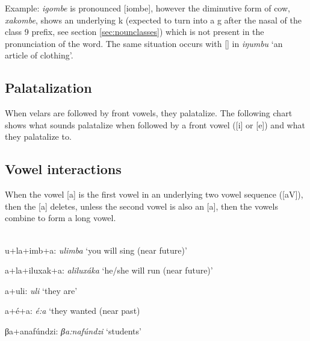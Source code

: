 
Example: \emph{i\engma{}gombe} is pronounced [i\engma{}ombe], however the diminutive form of cow, \emph{xakombe}, shows an underlying k (expected to turn into a g after the nasal of the class 9 prefix, see section \ref{sec:nounclasses}) which is not present in the pronunciation of the word.  The same situation occurs with [\engma{}] in \emph{iŋumbu} `an article of clothing'.

\subsection{Palatalization}
When velars are followed by front vowels, they palatalize.  The following chart shows what sounds palatalize when followed by a front vowel ([i] or [e]) and what they palatalize to.

\noindent\begin{minipage}{\linewidth}
\normalsize
\end{minipage}

\subsection{Vowel interactions}\label{sec:arules}
When the vowel [a] is the first vowel in an underlying two vowel sequence ([aV]), then the [a] deletes, unless the second vowel is also an [a], then the vowels combine to form a long vowel.\\
\fbox{[ai,au,ao,ae] \becomes [i,u,o,e]}\\
\fbox{[a] +[a] \becomes [a:]}

\begin{wrdex}
\item u+la+imb+a: \emph{ulimba} `you will sing (near future)' 
\item a+la+iluxak+a: \emph{alilux\'aka} `he/she will run (near future)' 
\item \beta{}a+uli: \emph{\beta{}uli} `they are' 
\item \beta{}a+\'e\palnas{}+a: \emph{\beta{}\'e:\palnas{}a} `they wanted (near past)
\item βa+anafúndzi: \emph{βa:nafúndzi} `students' 
\end{wrdex}


